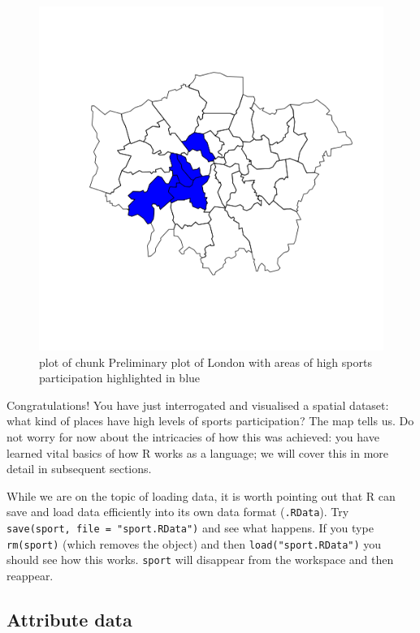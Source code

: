\documentclass[]{article}
\begin{document}
\begin{figure}[htbp]
\centering
\includegraphics{figure/Preliminary_plot_of_London_with_areas_of_high_sports_participation_highlighted_in_blue.png}
\caption{plot of chunk Preliminary plot of London with areas of high
sports participation highlighted in blue}
\end{figure}

Congratulations! You have just interrogated and visualised a spatial
dataset: what kind of places have high levels of sports participation?
The map tells us. Do not worry for now about the intricacies of how this
was achieved: you have learned vital basics of how R works as a
language; we will cover this in more detail in subsequent sections.

While we are on the topic of loading data, it is worth pointing out that
R can save and load data efficiently into its own data format
(\texttt{.RData}). Try \texttt{save(sport, file = "sport.RData")} and
see what happens. If you type \texttt{rm(sport)} (which removes the
object) and then \texttt{load("sport.RData")} you should see how this
works. \texttt{sport} will disappear from the workspace and then
reappear.

\subsection{Attribute data}\label{attribute-data}
\end{document}
